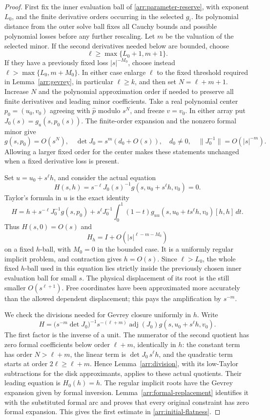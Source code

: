 \begin{proof}
First fix the inner evaluation ball of \eqref{arr:parameter-reserve},
with exponent \(L_0\), and the finite derivative orders occurring in
the selected \(g_i\).  Its polynomial distance from the outer solve
ball fixes all Cauchy bounds and possible polynomial losses before any
further rescaling.
Let \(m\) be the valuation of the selected minor.
If the second derivatives needed below are bounded, choose
\[
 \ell\ge\max\{L_0+1,m+1\}.
\]
If they have a previously fixed loss \(|s|^{-M_0}\), choose
instead \(\ell>\max\{L_0,m+M_0\}\).
In either case enlarge $\ell$ to the fixed threshold required in
Lemma~\ref{arr:gevrey}, in particular $\ell\ge k$, and then set
$N=\ell+m+1$.
Increase \(N\) and the polynomial approximation order if
needed to preserve all finite derivatives and leading
minor coefficients.
Take a real polynomial center \(p_0=(u_0,v_0)\) agreeing
with \(\widehat p\) modulo \(s^N\), and freeze \(v=v_0\).
In either array put \(J_0(s)=g_u(s,p_0(s))\).
The finite-order expansion and the nonzero formal minor give
\[
 g(s,p_0)=O(s^N),\quad
 \det J_0=s^m(d_0+O(s)),\quad d_0\ne0,\quad
 \|J_0^{-1}\|=O(|s|^{-m}).
\]
Allowing a larger fixed order for the center makes these
statements unchanged when a fixed derivative loss is present.

Set \(u=u_0+s^\ell h\), and consider the actual equation
\begin{equation}\label{arr:normalized-implicit}
 H(s,h)=s^{-\ell}J_0(s)^{-1}
       g(s,u_0+s^\ell h,v_0)=0 .
\end{equation}
Taylor's formula in \(u\) is the exact identity
\[
 H=h+s^{-\ell}J_0^{-1}g(s,p_0)
   +s^\ell J_0^{-1}\int_0^1(1-t)
     g_{uu}(s,u_0+ts^\ell h,v_0)[h,h]\,dt.
\]
Thus \(H(s,0)=O(s)\) and
\[
 H_h=I+O(|s|^{\ell-m-M_0})
\]
on a fixed \(h\)-ball, with \(M_0=0\) in the bounded case.
It is a uniformly regular implicit problem, and contraction
gives \(h=O(s)\).
Since $\ell>L_0$, the whole fixed $h$-ball used in this equation lies
strictly inside the previously chosen inner evaluation ball for small
$s$.  The physical displacement of its root is the still smaller
\(O(s^{\ell+1})\).
Free coordinates have been approximated more accurately
than the allowed dependent displacement; this pays the
amplification by \(s^{-m}\).

We check the divisions needed for Gevrey closure uniformly
in \(h\).  Write
\[
 H=\bigl(s^{-m}\det J_0\bigr)^{-1}
        s^{-(\ell+m)}
        \operatorname{adj}(J_0)
        g(s,u_0+s^\ell h,v_0).
\]
The first factor is the inverse of a unit.
The numerator of the second quotient has zero formal
coefficients below order \(\ell+m\), identically in \(h\):
the constant term has order \(N>\ell+m\), the linear
term is \(\det J_0\,s^\ell h\), and the quadratic term
starts at order \(2\ell\ge\ell+m\).
Hence Lemma~\ref{arr:division}, with its low-Taylor
subtractions for the disk approximants, applies to these
actual quotients.  Their leading equation is \(H_0(h)=h\).
The regular implicit roots have the Gevrey expansion
given by formal inversion.
Lemma~\ref{arr:formal-replacement} identifies it with the
substituted formal arc and proves that every original
constraint has zero formal expansion.  This gives the
first estimate in \eqref{arr:initial-flatness}.


\end{proof}
